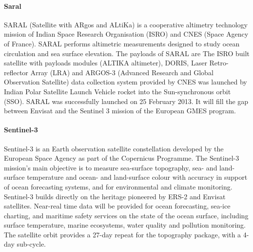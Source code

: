 \paragraph{Saral}
SARAL (Satellite with ARgos and ALtiKa) is a cooperative altimetry technology mission of Indian Space Research Organisation (ISRO) and CNES (Space Agency of France). SARAL performs altimetric measurements designed to study ocean circulation and sea surface elevation. The payloads of SARAL are The ISRO built satellite with payloads modules (ALTIKA altimeter), DORIS, Laser Retro-reflector Array (LRA) and ARGOS-3 (Advanced Research and Global Observation Satellite) data collection system provided by CNES was launched by Indian Polar Satellite Launch Vehicle rocket into the Sun-synchronous orbit (SSO). SARAL was successfully launched on 25 February 2013. It will fill the gap between Envisat and the Sentinel 3 mission of the European GMES program.
\paragraph{Sentinel-3}
Sentinel-3 is an Earth observation satellite constellation developed by the European Space Agency as part of the Copernicus Programme. The Sentinel-3 mission's main objective is to measure sea-surface topography, sea- and land-surface temperature and ocean- and land-surface colour with accuracy in support of ocean forecasting systems, and for environmental and climate monitoring. Sentinel-3 builds directly on the heritage pioneered by ERS-2 and Envisat satellites. Near-real time data will be provided for ocean forecasting, sea-ice charting, and maritime safety services on the state of the ocean surface, including surface temperature, marine ecosystems, water quality and pollution monitoring. The satellite orbit provides a 27-day repeat for the topography package, with a 4-day sub-cycle.
\clearpage
